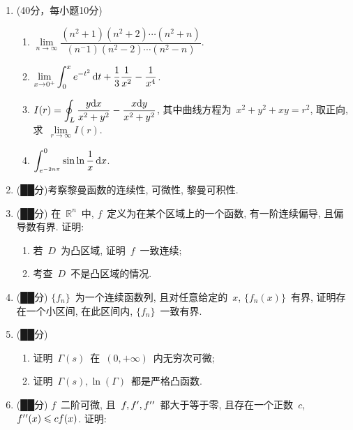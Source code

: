 \documentclass[UTF8,a4paper,11pt]{article}
\begin{document}
\begin{enumerate}
	\item (40分，每小题10分)
	      \begin{enumerate}
		      \item $\lim\limits_{n\to\infty}\dfrac{(n^2+1)(n^2+2)\cdots(n^2+n)}{(n^-1)(n^2-2)\cdots(n^2-n)}$.
		            \vspace{2em}
		      \item $\displaystyle\lim\limits_{x\to 0^{+}}\int_0^x e^{-t^2}\,\mathrm{d}t+\dfrac{1}{3}\dfrac{1}{x^2}-\dfrac{1}{x^4}$.
		            \vspace{2em}
		      \item $\displaystyle I(r)=\oint_{L} \dfrac{y\mathrm{d}x}{x^2+y^2}-\dfrac{x\mathrm{d}y}{x^2+y^2}$, 其中曲线方程为~$x^2+y^2+xy=r^2$, 取正向, 求~$\lim\limits_{r\to\infty} I(r)$.
		            \vspace{2em}
		      \item $\displaystyle\int_{e^{-2n\pi}}^0 \sin{\ln{\dfrac{1}{x}}}\,\mathrm{d}x$.
		            \vspace{2em}
	      \end{enumerate}
	\item (██分)考察黎曼函数的连续性, 可微性, 黎曼可积性.
	      \vspace{2em}
	\item (██分) 在~$\mathbb{R}^n$~中, $f$~定义为在某个区域上的一个函数, 有一阶连续偏导, 且偏导数有界. 证明:
	      \begin{enumerate}
		      \item 若~$D$~为凸区域, 证明~$f$~一致连续;
		      \item 考查~$D$~不是凸区域的情况.
	      \end{enumerate}
	      \vspace{2em}
	\item (██分) $\{f_n\}$~为一个连续函数列, 且对任意给定的~$x$, $\{f_n(x)\}$~有界, 证明存在一个小区间, 在此区间内, $\{f_n\}$~一致有界.
	      \vspace{2em}
	\item (██分)
	      \begin{enumerate}
		      \item 证明~$\Gamma(s)$~在~$(0,+\infty)$~内无穷次可微;
		      \item 证明~$\Gamma(s), \ln(\Gamma)$~都是严格凸函数.
	      \end{enumerate}
	      \vspace{2em}
	\item (██分) $f$~二阶可微, 且~$f,f\rq{},f\rq{}\rq{}$~都大于等于零, 且存在一个正数~$c$, $f\rq{}\rq{}(x)\leqslant cf(x)$. 证明:

\end{enumerate}
\end{document}
